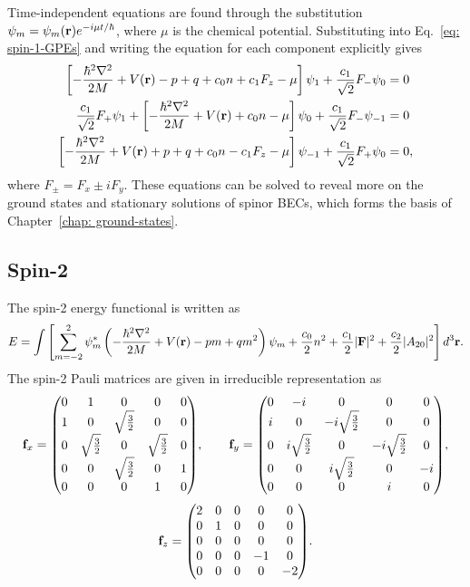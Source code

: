 Time-independent equations are found through the substitution
\(\psi_m = \psi_m(\vb{r})e^{-i\mu t/\hbar}\), where \(\mu\) is the chemical
potential.
Substituting into Eq.~\eqref{eq: spin-1-GPEs} and writing the equation for
each component explicitly gives
\begin{align}
    \left[-\frac{\hbar^2\nabla^2}{2M} + V(\vb{r}) - p + q + c_0n + c_1F_z
    - \mu\right]\psi_1 + \frac{c_1}{\sqrt{2}}F_-\psi_0 &= 0 \\
    \frac{c_1}{\sqrt{2}}F_+\psi_1 + \left[-\frac{\hbar^2\nabla^2}{2M}
    + V(\vb{r}) + c_0n - \mu\right]\psi_0 + \frac{c_1}{\sqrt{2}}F_-\psi_{-1}
    &= 0 \\
    \left[-\frac{\hbar^2\nabla^2}{2M} + V(\vb{r}) + p + q + c_0n - c_1F_z
    - \mu\right]\psi_{-1} + \frac{c_1}{\sqrt{2}}F_+\psi_0 &= 0,
\end{align}
where \(F_{\pm} = F_x \pm iF_y\).
These equations can be solved to reveal more on the ground states and stationary
solutions of spinor BECs, which forms the basis of
Chapter~\ref{chap: ground-states}.

\subsection{Spin-2}
The spin-2 energy functional is written as~\cite{Kawaguchi2012}
\begin{equation}\label{eq: spin-2-energy-functional}
    E = \int \left[\sum_{m=-2}^{2}\psi_m^* \left(-\frac{\hbar^2\nabla^2}{2M}
    + V(\vb{r}) -pm + qm^2\right)\psi_m + \frac{c_0}{2}n^2
    + \frac{c_1}{2}|\vb{F}|^2 + \frac{c_2}{2}|A_{20}|^2\right] d^3\vb{r}.
\end{equation}
The spin-2 Pauli matrices are given in irreducible representation as
\begin{equation*}
    \vb{f}_x = \mqty(0 & 1  & 0 & 0 & 0 \\
    1 & 0 & \sqrt{\frac{3}{2}} & 0 & 0 \\
    0 & \sqrt{\frac{3}{2}} & 0 & \sqrt{\frac{3}{2}} & 0 \\
    0 & 0 & \sqrt{\frac{3}{2}} & 0 & 1 \\
    0 & 0 & 0 & 1 & 0), \qquad
    \vb{f}_y = \mqty(0 & -i  & 0 & 0 & 0 \\
    i & 0 & -i\sqrt{\frac{3}{2}} & 0 & 0 \\
    0 & i\sqrt{\frac{3}{2}} & 0 & -i\sqrt{\frac{3}{2}} & 0 \\
    0 & 0 & i\sqrt{\frac{3}{2}} & 0 & -i \\
    0 & 0 & 0 & i & 0),
\end{equation*}
\begin{equation}
    \vb{f}_z = \mqty(2 & 0 & 0 & 0 & 0 \\
    0 & 1 & 0 & 0 & 0 \\
    0 & 0 & 0 & 0 & 0 \\
    0 & 0 & 0 & -1 & 0 \\
    0 & 0 & 0 & 0 & -2).
\end{equation}

